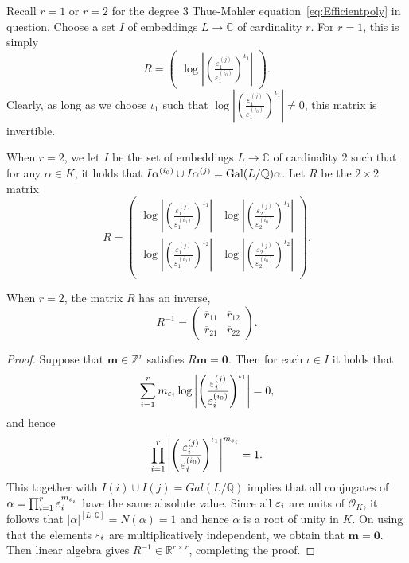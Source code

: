 Recall $r = 1$ or $r = 2$ for the degree $3$ Thue-Mahler equation~\eqref{eq:Efficientpoly} in question. Choose a set $I$ of embeddings $L \rightarrow \mathbb{C}$ of cardinality $r$. For $r = 1$, this is simply
\[R = \begin{pmatrix}
	\log\left|\left(\frac{\varepsilon_1^{(j)}}{\varepsilon_1^{(i_0)}}\right)^{\iota_1}\right| \end{pmatrix}.\]
Clearly, as long as we choose $\iota_1$ such that $\log\left|\left(\frac{\varepsilon_1^{(j)}}{\varepsilon_1^{(i_0)}}\right)^{\iota_1}\right| \neq 0$, this matrix is invertible.

When $r = 2$, we let $I$ be the set of embeddings $L \to \mathbb{C}$ of cardinality $2$ such that for any $\alpha \in K$, it holds that $I\alpha^{(i_0)} \cup I\alpha^{(j)} = \operatorname{Gal}(L/\mathbb{Q})\alpha$. Let $R$ be the $2 \times 2$ matrix
\[R = \begin{pmatrix}
	\log\left|\left(\frac{\varepsilon_1^{(j)}}{\varepsilon_1^{(i_0)}}\right)^{\iota_1}\right| &
	\log\left|\left(\frac{\varepsilon_2^{(j)}}{\varepsilon_2^{(i_0)}}\right)^{\iota_1}\right|\\
	\log\left|\left(\frac{\varepsilon_1^{(j)}}{\varepsilon_1^{(i_0)}}\right)^{\iota_2}\right| &
	\log\left|\left(\frac{\varepsilon_2^{(j)}}{\varepsilon_2^{(i_0)}}\right)^{\iota_2}\right|\\
	\end{pmatrix}.\]
\begin{lemma}
When $r = 2$, the matrix $R$ has an inverse,
\[R^{-1} = \begin{pmatrix}
	\overline{r}_{11} & \overline{r}_{12} \\
	\overline{r}_{21} & \overline{r}_{22}
\end{pmatrix}.\]
\end{lemma}
	
\begin{proof}
Suppose that $\mathbf{m}\in\mathbb{Z}^{r}$ satisfies $R\mathbf{m}=\mathbf{0}$. Then for each $\iota\in I$ it holds that 
\[\sum_{i=1}^r m_{\varepsilon_i} \log\left|\left(\frac{\varepsilon_i^{(j)}}{\varepsilon_i^{(i_0)}}\right)^{\iota_1}\right| =0,\] and hence 
\[\prod_{i=1}^r \left|\left(\frac{\varepsilon_i^{(j)}}{\varepsilon_i^{(i_0)}}\right)^{\iota_1}\right|^{m_{\varepsilon_i}}=1.\] This together with $I(i)\cup I(j)=Gal(L/\mathbb{Q})$ implies that all conjugates of $\alpha=\prod_{i=1}^r \varepsilon_i^{m_{\varepsilon_i}}$ have the same absolute value. Since all $\varepsilon_i$ are units of $\mathcal{O}_K$, it follows that $|\alpha|^{[L:\mathbb{Q}]}=N(\alpha)=1$ and hence $\alpha$ is a root of unity in $K$. On using that  the elements $\varepsilon_i$ are multiplicatively independent, we obtain that $\mathbf{m}=\mathbf{0}$.  Then linear algebra gives $R^{-1}\in\mathbb{R}^{r\times r}$, completing the proof. 
\end{proof}

